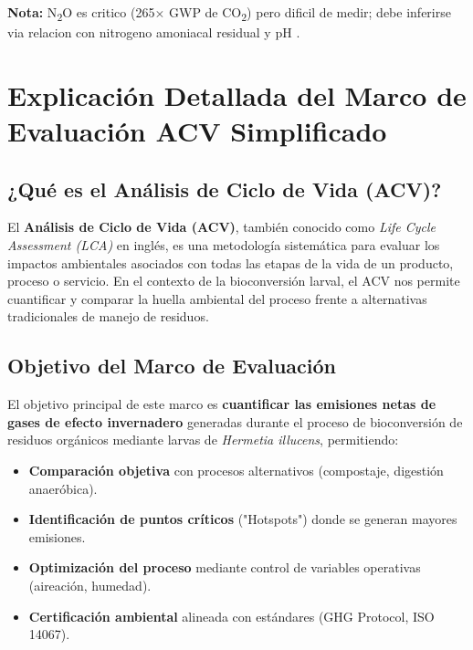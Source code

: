 \documentclass[12pt]{article}
\begin{document}
\noindent\textbf{Nota:} N\textsubscript{2}O es critico (265$\times$ GWP de CO\textsubscript{2}) pero dificil de medir; debe inferirse via relacion con nitrogeno amoniacal residual y pH \cite{ref59}.


\section{Explicación Detallada del Marco de Evaluación ACV Simplificado}

\subsection{¿Qué es el Análisis de Ciclo de Vida (ACV)?}

El \textbf{Análisis de Ciclo de Vida (ACV)}, también conocido como \textit{Life Cycle Assessment (LCA)} en inglés, es una metodología sistemática para evaluar los impactos ambientales asociados con todas las etapas de la vida de un producto, proceso o servicio. En el contexto de la bioconversión larval, el ACV nos permite cuantificar y comparar la huella ambiental del proceso frente a alternativas tradicionales de manejo de residuos.

\begin{center}
\end{center}

\subsection{Objetivo del Marco de Evaluación}

El objetivo principal de este marco es \textbf{cuantificar las emisiones netas de gases de efecto invernadero} generadas durante el proceso de bioconversión de residuos orgánicos mediante larvas de \textit{Hermetia illucens}, permitiendo:

\begin{itemize}
    \item \textcolor{concepto}{\textbf{Comparación objetiva}} con procesos alternativos (compostaje, digestión anaeróbica).
    \item \textcolor{concepto}{\textbf{Identificación de puntos críticos}} ("Hotspots") donde se generan mayores emisiones.
    \item \textcolor{concepto}{\textbf{Optimización del proceso}} mediante control de variables operativas (aireación, humedad).
    \item \textcolor{concepto}{\textbf{Certificación ambiental}} alineada con estándares (GHG Protocol, ISO 14067).
\end{itemize}
\end{document}
